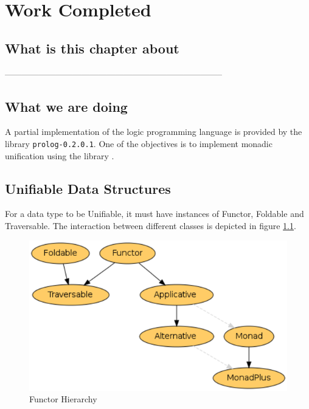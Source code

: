 \documentclass[thesis-solanki.tex]{subfiles}
\begin{document}
\chapter{Work Completed}\label{chap:workCompleted}


\section{What is this chapter about}

-----------------------------------------------------------------------------


\section{What we are doing}
A partial implementation of the logic programming language  is provided by the library \texttt{prolog-0.2.0.1}. One of the 
objectives is to implement monadic unification using the library \cite{unification-fd-lib}. 


\section{Unifiable Data Structures}
For a data type to be Unifiable, it must have instances of Functor, Foldable and Traversable. The interaction between different classes is depicted in figure 
\ref{fig:Functor Hierarchy}.

\begin{figure}[th]
\centering
\includegraphics[scale = 0.7]{FunctorHierarchy.png}
\caption{Functor Hierarchy \cite{website:foldablenadtraversable}}
\label{fig:Functor Hierarchy}
\end{figure}  
\end{document}
